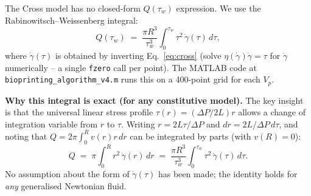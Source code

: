 \documentclass[11pt,a4paper]{article}
\newcommand{\gd}{\dot{\gamma}}
\begin{document}
The Cross model has no closed-form $Q(\tau_w)$ expression. We use the
Rabinowitsch--Weissenberg integral:
\begin{equation}
Q(\tau_w) \;=\; \frac{\pi R^3}{\tau_w^3}
\int_0^{\tau_w} \tau^2\,\gd(\tau)\, d\tau,
\label{eq:rabinowitsch}
\end{equation}
where $\gd(\tau)$ is obtained by inverting Eq.~\ref{eq:cross} (solve
$\eta(\gd)\gd=\tau$ for $\gd$ numerically -- a single \texttt{fzero}
call per point). The MATLAB code at
\texttt{bioprinting\_algorithm\_v4.m} runs this on a 400-point grid
for each $V_p$.

\textbf{Why this integral is exact (for any constitutive model).}
The key insight is that the universal linear stress profile
$\tau(r)=(\Delta P/2L)r$ allows a change of integration variable from
$r$ to $\tau$. Writing $r=2L\tau/\Delta P$ and $dr=2L/\Delta P\,d\tau$,
and noting that $Q=2\pi\int_0^R v(r)r\,dr$ can be integrated by parts
(with $v(R)=0$):
\[
Q \;=\; \pi\int_0^R r^2\,\gd(r)\,dr
  \;=\; \frac{\pi R^3}{\tau_w^3}
        \int_0^{\tau_w}\!\tau^2\,\gd(\tau)\,d\tau.
\]
No assumption about the form of $\gd(\tau)$ has been made; the identity
holds for \emph{any} generalised Newtonian fluid.
\end{document}
